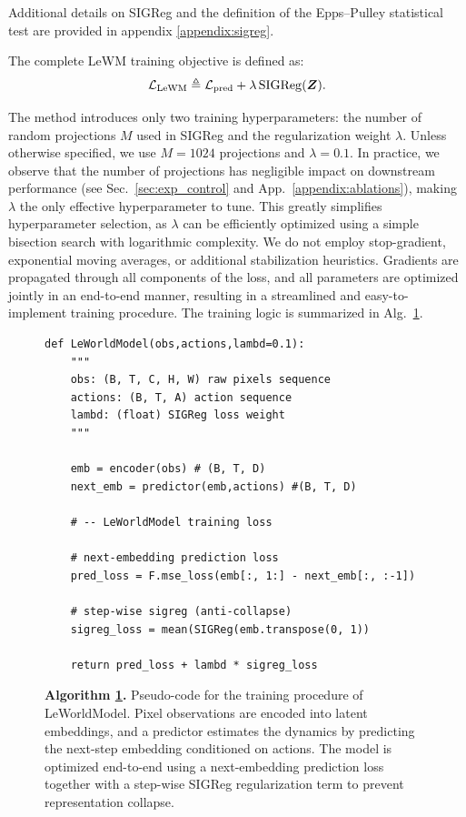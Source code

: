 Additional details on SIGReg and the definition of the Epps--Pulley statistical test are provided in appendix \ref{appendix:sigreg}.


The complete LeWM training objective is defined as:
\begin{equation}
{\mathcal{L}}_{\rm LeWM} \triangleq {\mathcal{L}}_{\rm pred} + \lambda\,{\rm SIGReg}({\bm{Z}}).
\end{equation}


The method introduces only two training hyperparameters: the number of random projections $M$ used in SIGReg and the regularization weight $\lambda$. Unless otherwise specified, we use $M = 1024$ projections and $\lambda = 0.1$. In practice, we observe that the number of projections has negligible impact on downstream performance (see Sec.~\ref{sec:exp_control} and App.~\ref{appendix:ablations}), making $\lambda$ the only effective hyperparameter to tune. This greatly simplifies hyperparameter selection, as $\lambda$ can be efficiently optimized using a simple bisection search with logarithmic complexity. We do not employ stop-gradient, exponential moving averages, or additional stabilization heuristics. Gradients are propagated through all components of the loss, and all parameters are optimized jointly in an end-to-end manner, resulting in a streamlined and easy-to-implement training procedure. The training logic is summarized in Alg.~\ref{alg:train-alg}.

\begin{figure}[t]
\centering
\captionsetup{labelformat=empty}
\caption{\textbf{Algorithm \ref*{alg:train-alg}.} Pseudo-code for the training procedure of LeWorldModel. Pixel observations are encoded into latent embeddings, and a predictor estimates the dynamics by predicting the next-step embedding conditioned on actions. The model is optimized end-to-end using a next-embedding prediction loss together with a step-wise SIGReg regularization term to prevent representation collapse.}
\addtocounter{figure}{-1}
\label{alg:train-alg}
\begin{tcolorbox}[
  colback=codebg,
  colframe=codebg,
  arc=7pt,
  outer arc=7pt,
  boxrule=0pt,
  left=3pt, right=3pt, top=3pt, bottom=3pt,
  width=0.9\linewidth
]
\begin{lstlisting}[style=pythonstyle]
def LeWorldModel(obs,actions,lambd=0.1):
    """
    obs: (B, T, C, H, W) raw pixels sequence
    actions: (B, T, A) action sequence
    lambd: (float) SIGReg loss weight
    """
    
    emb = encoder(obs) # (B, T, D)
    next_emb = predictor(emb,actions) #(B, T, D)
    
    # -- LeWorldModel training loss
    
    # next-embedding prediction loss
    pred_loss = F.mse_loss(emb[:, 1:] - next_emb[:, :-1])
    
    # step-wise sigreg (anti-collapse)
    sigreg_loss = mean(SIGReg(emb.transpose(0, 1))
    
    return pred_loss + lambd * sigreg_loss
\end{lstlisting}
\end{tcolorbox}
\end{figure}


